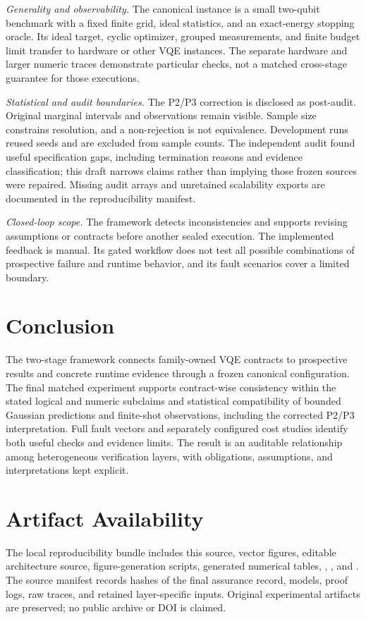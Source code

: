 \documentclass[conference]{IEEEtran}
\begin{document}
\emph{Generality and observability.} The canonical instance is a small two-qubit benchmark with a fixed finite grid, ideal statistics, and an exact-energy stopping oracle. Its ideal target, cyclic optimizer, grouped measurements, and finite budget limit transfer to hardware or other VQE instances. The separate hardware and larger numeric traces demonstrate particular checks, not a matched cross-stage guarantee for those executions.

\emph{Statistical and audit boundaries.} The P2/P3 correction is disclosed as post-audit. Original marginal intervals and observations remain visible. Sample size constrains resolution, and a non-rejection is not equivalence. Development runs reused seeds and are excluded from sample counts. The independent audit found useful specification gaps, including termination reasons and evidence classification; this draft narrows claims rather than implying those frozen sources were repaired. Missing audit arrays and unretained scalability exports are documented in the reproducibility manifest.

\emph{Closed-loop scope.} The framework detects inconsistencies and supports revising assumptions or contracts before another sealed execution. The implemented feedback is manual. Its gated workflow does not test all possible combinations of prospective failure and runtime behavior, and its fault scenarios cover a limited boundary.

\section{Conclusion}
The two-stage framework connects family-owned VQE contracts to prospective results and concrete runtime evidence through a frozen canonical configuration. The final matched experiment supports contract-wise consistency within the stated logical and numeric subclaims and statistical compatibility of bounded Gaussian predictions and finite-shot observations, including the corrected P2/P3 interpretation. Full fault vectors and separately configured cost studies identify both useful checks and evidence limits. The result is an auditable relationship among heterogeneous verification layers, with obligations, assumptions, and interpretations kept explicit.

\balance
\section*{Artifact Availability}
The local reproducibility bundle includes this source, vector figures, editable architecture source, figure-generation scripts, generated numerical tables, , , and . The source manifest records hashes of the final assurance record, models, proof logs, raw traces, and retained layer-specific inputs. Original experimental artifacts are preserved; no public archive or DOI is claimed.



\end{document}

